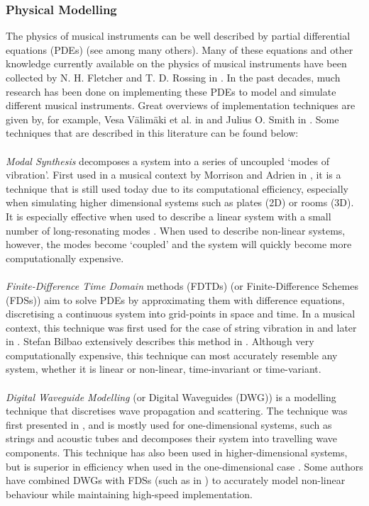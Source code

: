 \subsubsection*{Physical Modelling}
The physics of musical instruments can be well described by partial differential equations (PDEs) (see \cite{Bilbao2009} among many others). Many of these equations and other knowledge currently available on the physics of musical instruments have been collected by N. H. Fletcher and T. D. Rossing in \cite{Fletcher1998}. In the past decades, much research has been done on implementing these PDEs to model and simulate different musical instruments. Great overviews of implementation techniques are given by, for example, Vesa Välimäki et al. in \cite{Valimaki2006} and Julius O. Smith in \cite{Smith2010a, Smith2010b}. Some techniques that are described in this literature can be found below:
\\
\\
\emph{Modal Synthesis} decomposes a system into a series of uncoupled ‘modes of vibration’. First used in a musical context by Morrison and Adrien in \cite{Morrison1993}, it is a technique that is still used today due to its computational efficiency, especially when simulating higher dimensional systems such as plates (2D) or rooms (3D). It is especially effective when used to describe a linear system \cite{Bilbao2018} with a small number of long-resonating modes \cite{Smith2010a}. When used to describe non-linear systems, however, the modes become `coupled’ and the system will quickly become more computationally expensive. 
\\
\\
\emph{Finite-Difference Time Domain} methods (FDTDs) (or Finite-Difference Schemes (FDSs)) aim to solve PDEs by approximating them with difference equations, discretising a continuous system into grid-points in space and time. In a musical context, this technique was first used for the case of string vibration in \cite{Ruiz1969, Hiller1971I, Hiller1971II} and later in \cite{Chaigne1992, Chaigne1994}. Stefan Bilbao extensively describes this method in \cite{Bilbao2009, Bilbao2018}. Although very computationally expensive, this technique can most accurately resemble any system, whether it is linear or non-linear, time-invariant or time-variant.
\\
\\
\emph{Digital Waveguide Modelling} (or Digital Waveguides (DWG)) is a modelling technique that discretises wave propagation and scattering. The technique was first presented in \cite{Smith1992}, and is mostly used for one-dimensional systems, such as strings and acoustic tubes and decomposes their system into travelling wave components. This technique has also been used in higher-dimensional systems, but is superior in efficiency when used in the one-dimensional case \cite{Valimaki2006}. Some authors have combined DWGs with FDSs (such as in \cite{Erkut2002, Maestre2014}) to accurately model non-linear behaviour while maintaining high-speed implementation.
